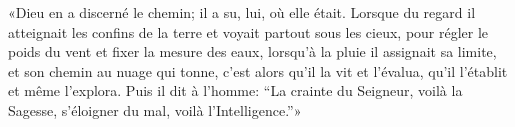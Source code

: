 «Dieu en a discerné le chemin; il a su, lui, où elle était.
Lorsque du regard il atteignait les confins de la terre et voyait partout sous les cieux,
	pour régler le poids du vent et fixer la mesure des eaux,
	lorsqu’à la pluie il assignait sa limite, et son chemin au nuage qui tonne,
	c’est alors qu’il la vit et l’évalua, qu’il l’établit et même l’explora.
Puis il dit à l’homme: “La crainte du Seigneur, voilà la Sagesse,
	s’éloigner du mal, voilà l’Intelligence.”»
